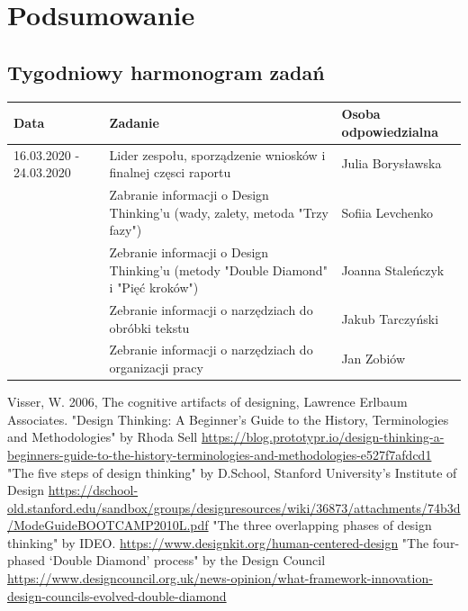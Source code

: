 \documentclass[a4paper,titleauthor]{mwart}
\begin{document}
\section{Podsumowanie}
\label{sec:podsumowanie}

\subsection{Tygodniowy harmonogram zadań}



\begin{tabular}{|p{2cm}|p{9cm}|p{3.5cm}|} \hline
Data & Zadanie & Osoba odpowiedzialna \\
\hline
16.03.2020 - 24.03.2020 & Lider zespołu, sporządzenie wniosków  i finalnej częsci raportu & Julia Borysławska \\
\hline
 & Zabranie informacji o Design Thinking'u (wady, zalety, metoda "Trzy fazy") & Sofiia Levchenko\\
\hline
& Zebranie informacji o Design Thinking'u (metody "Double Diamond" i "Pięć kroków") & Joanna Staleńczyk \\
\hline
& Zebranie informacji o narzędziach do obróbki tekstu & Jakub Tarczyński \\
\hline
& Zebranie informacji o narzędziach do organizacji pracy  & Jan Zobiów \\ 

\hline

\end{tabular}





\begin{thebibliography}{SYCYfProjekt}
 Visser, W. 2006, The cognitive artifacts of designing, Lawrence Erlbaum Associates.
"Design Thinking: A Beginner’s Guide to the History, Terminologies and Methodologies" by Rhoda Sell \url{https://blog.prototypr.io/design-thinking-a-beginners-guide-to-the-history-terminologies-and-methodologies-e527f7afdcd1}
"The five steps of design thinking" by D.School, Stanford University’s Institute of Design \url{https://dschool-old.stanford.edu/sandbox/groups/designresources/wiki/36873/attachments/74b3d/ModeGuideBOOTCAMP2010L.pdf}
"The three overlapping phases of design thinking" by IDEO. \url{https://www.designkit.org/human-centered-design}
"The four-phased ‘Double Diamond’ process" by the Design Council \url{https://www.designcouncil.org.uk/news-opinion/what-framework-innovation-design-councils-evolved-double-diamond}
\end{thebibliography}
\end{document}
